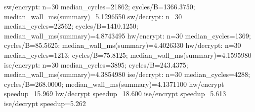 \begin{codeblock}
sw/encrypt: n=30 median_cycles=21862; cycles/B=1366.3750; median_wall_ms(summary)=5.1296550
sw/decrypt: n=30 median_cycles=22562; cycles/B=1410.1250; median_wall_ms(summary)=4.8743495
hw/encrypt: n=30 median_cycles=1369; cycles/B=85.5625; median_wall_ms(summary)=4.4026330
hw/decrypt: n=30 median_cycles=1213; cycles/B=75.8125; median_wall_ms(summary)=4.1595980
ise/encrypt: n=30 median_cycles=3895; cycles/B=243.4375; median_wall_ms(summary)=4.3854980
ise/decrypt: n=30 median_cycles=4288; cycles/B=268.0000; median_wall_ms(summary)=4.1371100
hw/encrypt speedup=15.969
hw/decrypt speedup=18.600
ise/encrypt speedup=5.613
ise/decrypt speedup=5.262
\end{codeblock}
